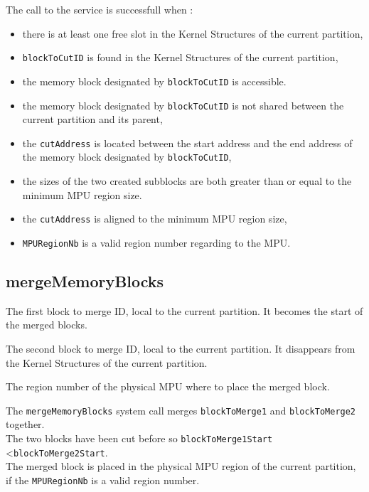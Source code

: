 \documentclass[10pt,a4paper,titlepage]{refart}
\begin{document}
The call to the service is successfull when :
\begin{itemize}
    \item there is at least one free slot in the Kernel Structures of the current partition,
    \item \texttt{blockToCutID} is found in the Kernel Structures of the current partition,
    \item the memory block designated by \texttt{blockToCutID} is accessible.
    \item the memory block designated by \texttt{blockToCutID} is not shared between the current partition and its parent,
    \item the \texttt{cutAddress} is located between the start address and the end address of the memory block designated by \texttt{blockToCutID},
    \item the sizes of the two created subblocks are both greater than or equal to the minimum MPU region size.\\
    \item the \texttt{cutAddress} is aligned to the minimum MPU region size,
    \item \texttt{MPURegionNb} is a valid region number regarding to the MPU.
\end{itemize}

\subsection{mergeMemoryBlocks}
The first block to merge ID, local to the current partition. It becomes the start of the merged blocks.

The second block to merge ID, local to the current partition. It disappears from the Kernel Structures of the current partition.

The region number of the physical MPU where to place the merged block.

\medskip
The \texttt{mergeMemoryBlocks} system call merges \texttt{blockToMerge1} and \texttt{blockToMerge2} together.\\
The two blocks have been cut before so \texttt{blockToMerge1Start} \textless \texttt{blockToMerge2Start}.\\
The merged block is placed in the physical MPU region of the current partition, if the \texttt{MPURegionNb} is a valid region number.
\end{document}
